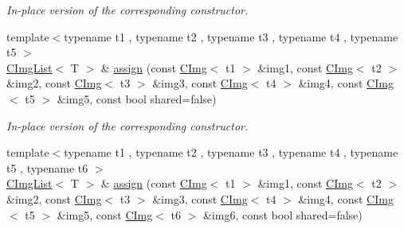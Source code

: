 \begin{DoxyCompactItemize}
\begin{DoxyCompactList}\small\item\em In-\/place version of the corresponding constructor. \item\end{DoxyCompactList}\item 
\hypertarget{structcimg__library_1_1CImgList_a554edc1d750adab1e29df397e1f48a1f}{
{\footnotesize template$<$typename t1 , typename t2 , typename t3 , typename t4 , typename t5 $>$ }\\\hyperlink{structcimg__library_1_1CImgList}{CImgList}$<$ T $>$ \& \hyperlink{structcimg__library_1_1CImgList_a554edc1d750adab1e29df397e1f48a1f}{assign} (const \hyperlink{structcimg__library_1_1CImg}{CImg}$<$ t1 $>$ \&img1, const \hyperlink{structcimg__library_1_1CImg}{CImg}$<$ t2 $>$ \&img2, const \hyperlink{structcimg__library_1_1CImg}{CImg}$<$ t3 $>$ \&img3, const \hyperlink{structcimg__library_1_1CImg}{CImg}$<$ t4 $>$ \&img4, const \hyperlink{structcimg__library_1_1CImg}{CImg}$<$ t5 $>$ \&img5, const bool shared=false)}
\label{structcimg__library_1_1CImgList_a554edc1d750adab1e29df397e1f48a1f}

\begin{DoxyCompactList}\small\item\em In-\/place version of the corresponding constructor. \item\end{DoxyCompactList}\item 
\hypertarget{structcimg__library_1_1CImgList_a9b4e4f632b087b23675c64c18c5dc4a9}{
{\footnotesize template$<$typename t1 , typename t2 , typename t3 , typename t4 , typename t5 , typename t6 $>$ }\\\hyperlink{structcimg__library_1_1CImgList}{CImgList}$<$ T $>$ \& \hyperlink{structcimg__library_1_1CImgList_a9b4e4f632b087b23675c64c18c5dc4a9}{assign} (const \hyperlink{structcimg__library_1_1CImg}{CImg}$<$ t1 $>$ \&img1, const \hyperlink{structcimg__library_1_1CImg}{CImg}$<$ t2 $>$ \&img2, const \hyperlink{structcimg__library_1_1CImg}{CImg}$<$ t3 $>$ \&img3, const \hyperlink{structcimg__library_1_1CImg}{CImg}$<$ t4 $>$ \&img4, const \hyperlink{structcimg__library_1_1CImg}{CImg}$<$ t5 $>$ \&img5, const \hyperlink{structcimg__library_1_1CImg}{CImg}$<$ t6 $>$ \&img6, const bool shared=false)}
\label{structcimg__library_1_1CImgList_a9b4e4f632b087b23675c64c18c5dc4a9}


\end{DoxyCompactItemize}
